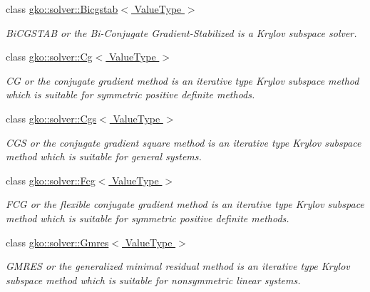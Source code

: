 \begin{DoxyCompactItemize}
class \hyperlink{classgko_1_1solver_1_1Bicgstab}{gko\+::solver\+::\+Bicgstab$<$ Value\+Type $>$}
\begin{DoxyCompactList}\small\item\em Bi\+C\+G\+S\+T\+AB or the Bi-\/\+Conjugate Gradient-\/\+Stabilized is a Krylov subspace solver. \end{DoxyCompactList}\item 
class \hyperlink{classgko_1_1solver_1_1Cg}{gko\+::solver\+::\+Cg$<$ Value\+Type $>$}
\begin{DoxyCompactList}\small\item\em CG or the conjugate gradient method is an iterative type Krylov subspace method which is suitable for symmetric positive definite methods. \end{DoxyCompactList}\item 
class \hyperlink{classgko_1_1solver_1_1Cgs}{gko\+::solver\+::\+Cgs$<$ Value\+Type $>$}
\begin{DoxyCompactList}\small\item\em C\+GS or the conjugate gradient square method is an iterative type Krylov subspace method which is suitable for general systems. \end{DoxyCompactList}\item 
class \hyperlink{classgko_1_1solver_1_1Fcg}{gko\+::solver\+::\+Fcg$<$ Value\+Type $>$}
\begin{DoxyCompactList}\small\item\em F\+CG or the flexible conjugate gradient method is an iterative type Krylov subspace method which is suitable for symmetric positive definite methods. \end{DoxyCompactList}\item 
class \hyperlink{classgko_1_1solver_1_1Gmres}{gko\+::solver\+::\+Gmres$<$ Value\+Type $>$}
\begin{DoxyCompactList}\small\item\em G\+M\+R\+ES or the generalized minimal residual method is an iterative type Krylov subspace method which is suitable for nonsymmetric linear systems. \end{DoxyCompactList}\end{DoxyCompactItemize}
